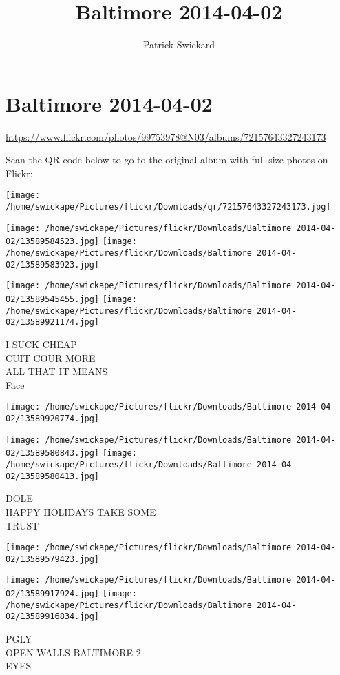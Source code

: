 \documentclass[10pt,letterpaper]{article}
\title{Baltimore 2014-04-02}
\author{Patrick Swickard}
\date{}
\begin{document}
\section*{Baltimore 2014-04-02}

\url{https://www.flickr.com/photos/99753978@N03/albums/72157643327243173}

Scan the QR code below to go to the original album with full-size photos on Flickr:

\texttt{[image: /home/swickape/Pictures/flickr/Downloads/qr/72157643327243173.jpg]}
\pagebreak

\texttt{[image: /home/swickape/Pictures/flickr/Downloads/Baltimore 2014-04-02/13589584523.jpg]}
\texttt{[image: /home/swickape/Pictures/flickr/Downloads/Baltimore 2014-04-02/13589583923.jpg]}

\texttt{[image: /home/swickape/Pictures/flickr/Downloads/Baltimore 2014-04-02/13589545455.jpg]}
\texttt{[image: /home/swickape/Pictures/flickr/Downloads/Baltimore 2014-04-02/13589921174.jpg]}

I SUCK CHEAP\\
CUIT COUR MORE\\
ALL THAT IT MEANS\\
Face
\pagebreak

\texttt{[image: /home/swickape/Pictures/flickr/Downloads/Baltimore 2014-04-02/13589920774.jpg]}

\vspace{0.25in}
\texttt{[image: /home/swickape/Pictures/flickr/Downloads/Baltimore 2014-04-02/13589580843.jpg]}
\texttt{[image: /home/swickape/Pictures/flickr/Downloads/Baltimore 2014-04-02/13589580413.jpg]}

DOLE\\
HAPPY HOLIDAYS TAKE SOME\\
TRUST
\pagebreak

\texttt{[image: /home/swickape/Pictures/flickr/Downloads/Baltimore 2014-04-02/13589579423.jpg]}

\vspace{0.25in}
\texttt{[image: /home/swickape/Pictures/flickr/Downloads/Baltimore 2014-04-02/13589917924.jpg]}
\texttt{[image: /home/swickape/Pictures/flickr/Downloads/Baltimore 2014-04-02/13589916834.jpg]}

PGLY\\
OPEN WALLS BALTIMORE 2\\
EYES
\pagebreak
\end{document}
